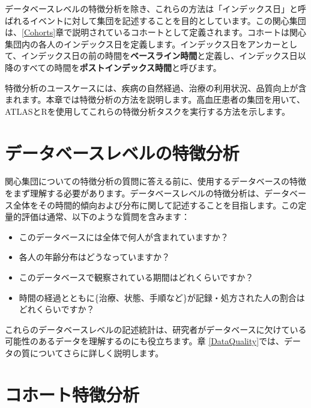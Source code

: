\documentclass[
  11pt]{book}
\providecommand{\tightlist}{%
  \setlength{\itemsep}{0pt}\setlength{\parskip}{0pt}}
\theoremstyle{definition}
\theoremstyle{definition}
\theoremstyle{definition}
\theoremstyle{definition}
\theoremstyle{remark}
\begin{document}
データベースレベルの特徴分析を除き、これらの方法は「インデックス日」と呼ばれるイベントに対して集団を記述することを目的としています。この関心集団は、\ref{Cohorts}章で説明されているコホートとして定義されます。コホートは関心集団内の各人のインデックス日を定義します。インデックス日をアンカーとして、インデックス日の前の時間を\textbf{ベースライン時間}と定義し、インデックス日以降のすべての時間を\textbf{ポストインデックス時間}と呼びます。

特徴分析のユースケースには、疾病の自然経過、治療の利用状況、品質向上が含まれます。本章では特徴分析の方法を説明します。高血圧患者の集団を用いて、ATLASとRを使用してこれらの特徴分析タスクを実行する方法を示します。       

\section{データベースレベルの特徴分析}\label{ux30c7ux30fcux30bfux30d9ux30fcux30b9ux30ecux30d9ux30ebux306eux7279ux5fb4ux5206ux6790}

関心集団についての特徴分析の質問に答える前に、使用するデータベースの特徴をまず理解する必要があります。データベースレベルの特徴分析は、データベース全体をその時間的傾向および分布に関して記述することを目指します。この定量的評価は通常、以下のような質問を含みます：

\begin{itemize}
\tightlist
\item
  このデータベースには全体で何人が含まれていますか？
\item
  各人の年齢分布はどうなっていますか？
\item
  このデータベースで観察されている期間はどれくらいですか？
\item
  時間の経過とともに\{治療、状態、手順など\}が記録・処方された人の割合はどれくらいですか？
\end{itemize}

これらのデータベースレベルの記述統計は、研究者がデータベースに欠けている可能性のあるデータを理解するのにも役立ちます。章 \ref{DataQuality}では、データの質についてさらに詳しく説明します。 

\section{コホート特徴分析}\label{ux30b3ux30dbux30fcux30c8ux7279ux5fb4ux5206ux6790}
\end{document}
